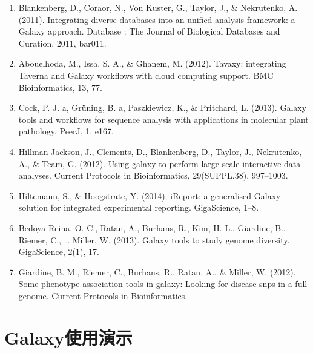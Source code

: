 \documentclass[11pt,a4paper,twoside]{book}
\begin{document}
{{\begin{enumerate}
  \item Blankenberg, D., Coraor, N., Von Kuster, G., Taylor, J., \& Nekrutenko, A. (2011). Integrating diverse databases into an unified analysis framework: a Galaxy approach. Database : The Journal of Biological Databases and Curation, 2011, bar011.
  \item Abouelhoda, M., Issa, S. A., \& Ghanem, M. (2012). Tavaxy: integrating Taverna and Galaxy workflows with cloud computing support. BMC Bioinformatics, 13, 77.
  \item Cock, P. J. a, Grüning, B. a, Paszkiewicz, K., \& Pritchard, L. (2013). Galaxy tools and workflows for sequence analysis with applications in molecular plant pathology. PeerJ, 1, e167.
  \item Hillman-Jackson, J., Clements, D., Blankenberg, D., Taylor, J., Nekrutenko, A., \& Team, G. (2012). Using galaxy to perform large-scale interactive data analyses. Current Protocols in Bioinformatics, 29(SUPPL.38), 997–1003.
  \item Hiltemann, S., \& Hoogstrate, Y. (2014). iReport: a generalised Galaxy solution for integrated experimental reporting. GigaScience, 1–8.
  \item Bedoya-Reina, O. C., Ratan, A., Burhans, R., Kim, H. L., Giardine, B., Riemer, C., … Miller, W. (2013). Galaxy tools to study genome diversity. GigaScience, 2(1), 17.
  \item Giardine, B. M., Riemer, C., Burhans, R., Ratan, A., \& Miller, W. (2012). Some phenotype association tools in galaxy: Looking for disease snps in a full genome. Current Protocols in Bioinformatics.
\end{enumerate}
}}

\section{Galaxy使用演示}
\end{document}

